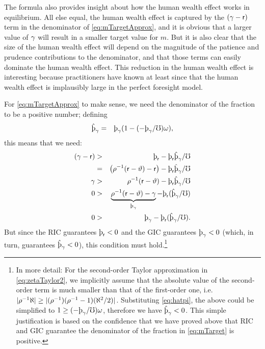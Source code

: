 \message{ !name(TractableBufferStock.tex)}\documentclass{handout}
\begin{document}
The formula also provides insight about how the human wealth effect
works in equilibrium.  All else equal, the human wealth effect is captured
by the $(\gamma-\mathsf{r})$ term in the denominator of \eqref{eq:mTargetApprox},
and it is obvious that a larger value of $\gamma$ will result in a smaller
target value for $m$.  But it is also clear that the size of the human wealth
effect will depend on the magnitude of the patience and prudence contributions
to the denominator, and that those terms can easily dominate the human wealth
effect.  This reduction in the human wealth effect is interesting because practitioners have known at least since
\cite{summersCapTax} that the human wealth effect is implausibly large in the
perfect foresight model.

For \eqref{eq:mTargetApprox} to make sense, we need
the denominator of the fraction to be a positive number;
defining
\begin{eqnarray}
  \patpGrohat & = & \patpGro(1-(-\patpGro/\urate)\prudEx),
\end{eqnarray}
this means that we need:
\begin{eqnarray}
    (\pGro - \rfree) & > & \patr - \patr\patpGrohat/\urate
\\   & = & \left(\CRRA^{-1}(\rfree-\timeRate)-\rfree\right)-  \patr\patpGrohat/\urate
\\ \pGro & > & \CRRA^{-1}(\rfree-\timeRate)-  \patr\patpGrohat/\urate
\\ 0 & > & \underbrace{\CRRA^{-1}(\rfree-\timeRate) - \pGro}_{\patpGro} -  \patr(\patpGrohat/\urate)
\\ 0 & > & \patpGro -  \patr(\patpGrohat/\urate) \label{eq:newDenom}
.
\end{eqnarray}
But since the RIC guarantees $\patr<0$ and the GIC guarantees $\patpGro<0$ (which, in turn, guarantees $\patpGrohat < 0$), this condition must hold.\footnote{In more detail: For the second-order Taylor approximation in \eqref{eq:zetaTaylor2}, we implicitly assume that the absolute value of the second-order term is much smaller than that of the first-order one, i.e. $|\rho^{-1} \aleph | \geq |(\rho^{-1})(\rho^{-1}-1)(\aleph^{2}/2)|$. Substituting \eqref{eq:hatpi}, the above could be simplified to $1 \geq (-\patpGro/\urate)\prudEx$, therefore we have $\patpGrohat < 0$. This simple justification is based on the confidence that we have proved above that RIC and GIC guarantee the denominator of the fraction in \eqref{eq:mTarget} is positive.}
\end{document}
